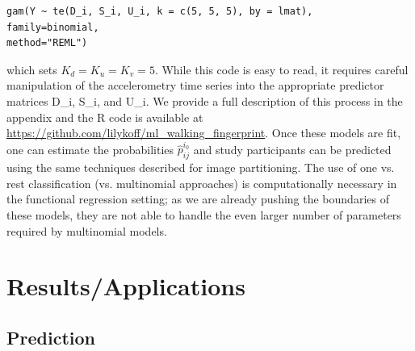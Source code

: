 \begin{verbatim}
gam(Y ~ te(D_i, S_i, U_i, k = c(5, 5, 5), by = lmat),
family=binomial, 
method="REML")
\end{verbatim}

which sets $K_d = K_u = K_v = 5$. While this code is easy to read, it requires careful manipulation of the accelerometry time series into the appropriate predictor matrices {\ttfamily D\_i}, {\ttfamily S\_i}, and {\ttfamily U\_i}. We provide a full description of this process in the appendix and the R code is available at \url{https://github.com/lilykoff/ml_walking_fingerprint}. Once these models are fit, one can estimate the probabilities $\widehat{p}_{ij}^{i_0}$ and study participants can be predicted using the same techniques described for image partitioning. The use of one vs. rest classification (vs. multinomial approaches) is computationally necessary in the functional regression setting; as we are already pushing the boundaries of these models, they are not able to handle the even larger number of parameters required by multinomial models. 

\section{Results/Applications}
 
\subsection{Prediction} 
